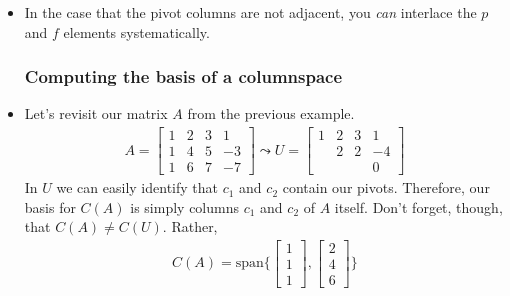 \documentclass[11pt]{article}
\begin{document}
\begin{itemize}
\item In the case that the pivot columns are not adjacent, you \textit{can} interlace the $p$ and $f$ elements systematically.

\subsubsection*{Computing the basis of a columnspace}
\item Let's revisit our matrix $A$ from the previous example.
\begin{align}
    A = \begin{bmatrix}
      1 & 2 & 3 & 1\\
    1 & 4 & 5 & -3\\
    1 & 6 & 7 & -7
    \end{bmatrix}
	\leadsto
	U= \begin{bmatrix}
	  1 & 2 & 3 & 1\\
	 & 2 & 2 & -4\\
	 &  &  & 0
	\end{bmatrix}
\end{align}
In $U$ we can easily identify that $c_{1}$ and $c_{2}$ contain our pivots. Therefore, our basis for $C(A)$ is simply columns $c_{1}$ and $c_{2}$ of $A$ itself. Don't forget, though, that $C(A) \neq C(U)$. Rather,
\begin{align}
    C(A) = \text{span}\Biggl\{\begin{bmatrix}
	  1\\
	1\\
	1
	\end{bmatrix}, \begin{bmatrix}
	  2\\
	4\\
	6	
	\end{bmatrix} \Biggl\}
\end{align}


\end{itemize}
\end{document}

